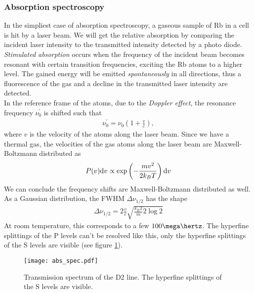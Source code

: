 \subsubsection{Absorption spectroscopy}
In the simpliest case of absorption spectroscopy, a gaseous sample of Rb in a cell is hit by a laser beam. We will get the relative absorption by comparing the incident laser intensity to the transmitted intensity detected by a photo diode. \emph{Stimulated absorption} occurs when the frequency of the incident beam becomes resonant with certain transition frequencies, exciting the Rb atoms to a higher level. The gained energy will be emitted \emph{spontaneously} in all directions, thus a fluorescence of the gas and a decline in the transmitted laser intensity are detected.\\
In the reference frame of the atoms, due to the \emph{Doppler effect}, the resonance frequency $\nu_0^\prime$ is shifted such that
\begin{align}
\nu_0^\prime=\nu_0\left(1+\frac{v}{c}\right),
\end{align}
where $v$ is the velocity of the atoms along the laser beam.
Since we have a thermal gas, the velocities of the gas atoms along the laser beam are Maxwell-Boltzmann distributed as
\begin{align}
P(v)\mathrm{d} v\propto \exp\left(-\frac{mv^2}{2k_B T}\right)\mathrm{d} v
\end{align}
We can conclude the frequency shifts are Maxwell-Boltzmann distributed as well. As a Gaussian distribution, the FWHM $\Delta\nu_{1/2}$ has the shape
\begin{align}
\Delta\nu_{1/2}=2\frac{v}{c}\sqrt{\frac{k_B T}{m}2\log 2}
\end{align}
At room temperature, this corresponds to a few $100\mega\hertz$. The hyperfine splittings of the P levels can't be resolved like this, only the hyperfine splittings of the S levels are visible (see figure \ref{fig:abs_spec}).
\begin{figure}[h]
	\centering
	\texttt{[image: abs\_spec.pdf]}
	\caption[Transmission spectrum of the D2 line]{Transmission spectrum of the D2 line. The hyperfine splittings of the S levels are visible. \cite{lit:AK_manual2012}}
	\label{fig:abs_spec}
\end{figure}

\newpage
